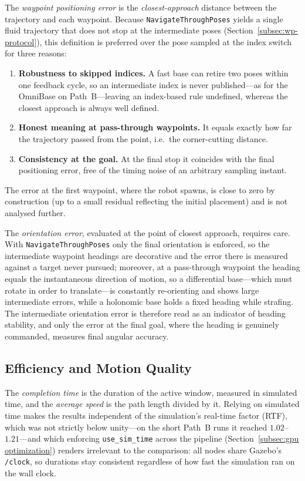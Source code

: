The \emph{waypoint positioning error} is the \emph{closest-approach} distance between the trajectory and each waypoint. Because \texttt{NavigateThroughPoses} yields a single fluid trajectory that does not stop at the intermediate poses (Section~\ref{subsec:wp-protocol}), this definition is preferred over the pose sampled at the index switch for three reasons:
\begin{enumerate}
    \item \textbf{Robustness to skipped indices.} A fast base can retire two poses within one feedback cycle, so an intermediate index is never published---as for the OmniBase on Path~B---leaving an index-based rule undefined, whereas the closest approach is always well defined.
    \item \textbf{Honest meaning at pass-through waypoints.} It equals exactly how far the trajectory passed from the point, i.e.\ the corner-cutting distance.
    \item \textbf{Consistency at the goal.} At the final stop it coincides with the final positioning error, free of the timing noise of an arbitrary sampling instant.
\end{enumerate}
The error at the first waypoint, where the robot spawns, is close to zero by construction (up to a small residual reflecting the initial placement) and is not analysed further.

The \emph{orientation error}, evaluated at the point of closest approach, requires care. With \texttt{NavigateThroughPoses} only the final orientation is enforced, so the intermediate waypoint headings are decorative and the error there is measured against a target never pursued; moreover, at a pass-through waypoint the heading equals the instantaneous direction of motion, so a differential base---which must rotate in order to translate---is constantly re-orienting and shows large intermediate errors, while a holonomic base holds a fixed heading while strafing. The intermediate orientation error is therefore read as an indicator of heading stability, and only the error at the final goal, where the heading is genuinely commanded, measures final angular accuracy.

\subsection{Efficiency and Motion Quality}
\label{subsec:m-efficiency}

The \emph{completion time} is the duration of the active window, measured in simulated time, and the \emph{average speed} is the path length divided by it. Relying on simulated time makes the results independent of the simulation's real-time factor (RTF), which was not strictly below unity---on the short Path~B runs it reached $1.02$--$1.21$---and which enforcing \texttt{use\_sim\_time} across the pipeline (Section~\ref{subsec:gpu optimization}) renders irrelevant to the comparison: all nodes share Gazebo's \texttt{/clock}, so durations stay consistent regardless of how fast the simulation ran on the wall clock.

